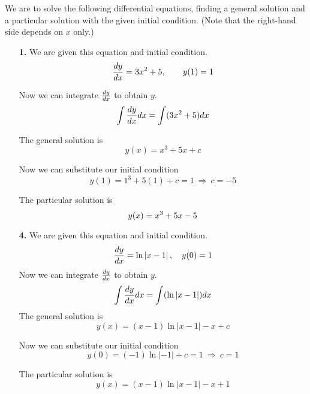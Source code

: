 
We are to solve the following differential equations, finding a general solution and a particular solution with the given initial condition. (Note that the right-hand side depends on \(x\) only.)
\begin{enumerate}
	\item[\textbf{1.}]
		We are given this equation and initial condition.
		\[\frac{dy}{dx} = 3x^2 + 5, \qquad y(1) = 1\]

		Now we can integrate \(\frac{dy}{dx}\) to obtain \(y\).
		\[
			\int \frac{dy}{dx} dx = \int (3x^2 + 5) dx
		\]

		The general solution is
		\[
			y(x) = x^3 + 5x + c
		\]

		Now we can substitute our initial condition
		\[
			y(1) = 1^3 + 5(1) + c = 1\ \Rightarrow\ c = -5
		\]

		The particular solution is
		\[
			y(x) = x^3 + 5x - 5 \\
		\]

	\item[\textbf{4.}]
		We are given this equation and initial condition.
		\[\frac{dy}{dx} = \ln \left| x-1 \right|, \hspace{1em} y(0) = 1\]
		Now we can integrate \(\frac{dy}{dx}\) to obtain \(y\).
		\[
			\int \frac{dy}{dx} dx = \int (\ln \left| x-1 \right|) dx
		\]
		The general solution is
		\[
			y(x) = (x-1) \ln \left| x-1 \right| - x + c
		\]

		Now we can substitute our initial condition
		\[
			y(0) = (-1) \ln \left| -1 \right| + c = 1\ \Rightarrow\ c = 1
		\]

		The particular solution is
		\[
			y(x) = (x-1) \ln \left| x-1 \right| - x + 1
		\]

\end{enumerate}